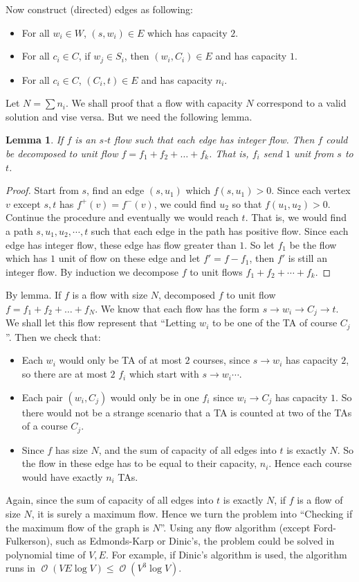 \documentclass[12pt, a4paper]{article}
\newcommand{\opord}{\operatorname{\mathcal{O}}}
\newcommand{\ord}[1]{\opord\left(#1\right)}
\newtheorem{lemma}{Lemma}
\begin{document}
Now construct (directed) edges as following:
\begin{itemize}
  \item For all $w_i \in W$, $(s, w_i) \in E$ which has capacity $2$.
  \item For all $c_i \in C$, if $w_j \in S_i$, then $(w_i, C_i) \in E$ and has capacity $1$.
  \item For all $c_i \in C$, $(C_i, t) \in E$ and has capacity $n_i$.
\end{itemize}
Let $N = \sum n_i$. We shall proof that a flow with capacity $N$ correspond to
a valid solution and vise versa. But we need the following lemma.
\begin{lemma}
  If $f$ is an $s$-$t$ flow such that each edge has integer flow.
  Then $f$ could be decomposed to unit flow $f = f_1 + f_2 + \dots + f_k$.
  That is, $f_i$ send $1$ unit from $s$ to $t$.
\end{lemma}
\begin{proof}
  Start from $s$, find an edge $(s, u_1)$ which $f(s, u_1) > 0$. Since each vertex $v$ except
  $s, t$ has $f^+(v) = f^-(v)$, we could find $u_2$ so that $f(u_1, u_2) > 0$. Continue the procedure
  and eventually we would reach $t$. That is, we would find a path $s, u_1, u_2, \cdots, t$
  such that each edge in the path has positive flow. Since each edge has integer flow,
  these edge has flow greater than $1$. So let $f_1$ be the flow which has $1$ unit of
  flow on these edge and let $f' = f - f_1$, then $f'$ is still an integer flow.
  By induction we decompose $f$ to unit flows $f_1 + f_2 + \cdots + f_k$.
\end{proof}

By lemma. If $f$ is a flow with size $N$, decomposed $f$ to unit flow $f = f_1 + f_2 + \dots + f_N$.
We know that each flow has the form $s \to w_i \to C_j \to t$. We shall let this flow
represent that ``Letting $w_i$ to be one of the TA of course $C_j$''. Then we check that:

\begin{itemize}
  \item Each $w_i$ would only be TA of at most $2$ courses, since $s \to w_i$ has capacity $2$,
    so there are at most $2$ $f_i$ which start with $s \to w_i \cdots$.
  \item Each pair $(w_i, C_j)$ would only be in one $f_i$ since $w_i \to C_j$ has capacity $1$.
    So there would not be a strange scenario that a TA is counted at two of the TAs of a course $C_j$.
  \item Since $f$ has size $N$, and the sum of capacity of all edges into $t$ is exactly $N$.
    So the flow in these edge has to be equal to their capacity, $n_i$. Hence each course
    would have exactly $n_i$ TAs.
\end{itemize}
Again, since the sum of capacity of all edges into $t$ is exactly $N$, if $f$ is a flow of size $N$,
it is surely a maximum flow. Hence we turn the problem into ``Checking if the maximum flow of the
graph is $N$''. Using any flow algorithm (except Ford-Fulkerson), such as Edmonds-Karp
or Dinic's, the problem could be solved in polynomial time of $V, E$.
For example, if Dinic's algorithm is used, the algorithm runs in $\ord{V E \log V} \leq \ord{V^3 \log V}$.
\end{document}
